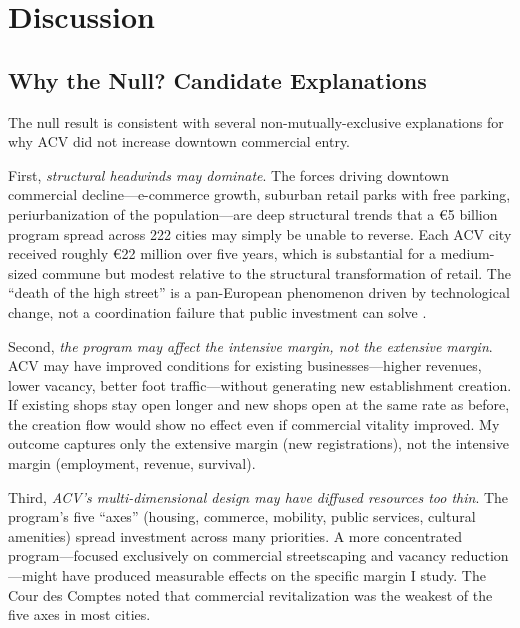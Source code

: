 \documentclass[12pt]{article}
\begin{document}
\section{Discussion}
\label{sec:discussion}

\subsection{Why the Null? Candidate Explanations}

The null result is consistent with several non-mutually-exclusive explanations for why ACV did not increase downtown commercial entry.

First, \textit{structural headwinds may dominate}. The forces driving downtown commercial decline---e-commerce growth, suburban retail parks with free parking, periurbanization of the population---are deep structural trends that a \euro 5 billion program spread across 222 cities may simply be unable to reverse. Each ACV city received roughly \euro 22 million over five years, which is substantial for a medium-sized commune but modest relative to the structural transformation of retail. The ``death of the high street'' is a pan-European phenomenon driven by technological change, not a coordination failure that public investment can solve \citep{glaeser2005urban}.

Second, \textit{the program may affect the intensive margin, not the extensive margin}. ACV may have improved conditions for existing businesses---higher revenues, lower vacancy, better foot traffic---without generating new establishment creation. If existing shops stay open longer and new shops open at the same rate as before, the creation flow would show no effect even if commercial vitality improved. My outcome captures only the extensive margin (new registrations), not the intensive margin (employment, revenue, survival).

Third, \textit{ACV's multi-dimensional design may have diffused resources too thin}. The program's five ``axes'' (housing, commerce, mobility, public services, cultural amenities) spread investment across many priorities. A more concentrated program---focused exclusively on commercial streetscaping and vacancy reduction---might have produced measurable effects on the specific margin I study. The Cour des Comptes \citeyearpar{courdescomptes2022} noted that commercial revitalization was the weakest of the five axes in most cities.
\end{document}
